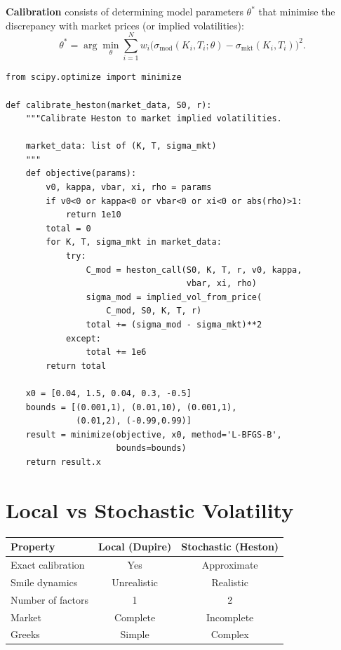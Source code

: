\begin{definition}
\textbf{Calibration} consists of determining model parameters $\theta^*$
that minimise the discrepancy with market prices (or implied volatilities):
\[
    \theta^* = \arg\min_\theta \sum_{i=1}^{N}
    w_i \bigl(\sigma_{\text{mod}}(K_i, T_i; \theta)
    - \sigma_{\text{mkt}}(K_i, T_i)\bigr)^2.
\]
\end{definition}

\begin{codeblock}[title=\textbf{Heston Model Calibration}]
\begin{verbatim}
from scipy.optimize import minimize

def calibrate_heston(market_data, S0, r):
    """Calibrate Heston to market implied volatilities.

    market_data: list of (K, T, sigma_mkt)
    """
    def objective(params):
        v0, kappa, vbar, xi, rho = params
        if v0<0 or kappa<0 or vbar<0 or xi<0 or abs(rho)>1:
            return 1e10
        total = 0
        for K, T, sigma_mkt in market_data:
            try:
                C_mod = heston_call(S0, K, T, r, v0, kappa,
                                    vbar, xi, rho)
                sigma_mod = implied_vol_from_price(
                    C_mod, S0, K, T, r)
                total += (sigma_mod - sigma_mkt)**2
            except:
                total += 1e6
        return total

    x0 = [0.04, 1.5, 0.04, 0.3, -0.5]
    bounds = [(0.001,1), (0.01,10), (0.001,1),
              (0.01,2), (-0.99,0.99)]
    result = minimize(objective, x0, method='L-BFGS-B',
                      bounds=bounds)
    return result.x
\end{verbatim}
\end{codeblock}

\section{Local vs Stochastic Volatility}

\begin{center}
\begin{tabular}{lcc}
    \toprule
    \textbf{Property} & \textbf{Local (Dupire)}
    & \textbf{Stochastic (Heston)} \\
    \midrule
    Exact calibration & Yes & Approximate \\
    Smile dynamics & Unrealistic & Realistic \\
    Number of factors & 1 & 2 \\
    Market & Complete & Incomplete \\
    Greeks & Simple & Complex \\
    \bottomrule
\end{tabular}
\end{center}

